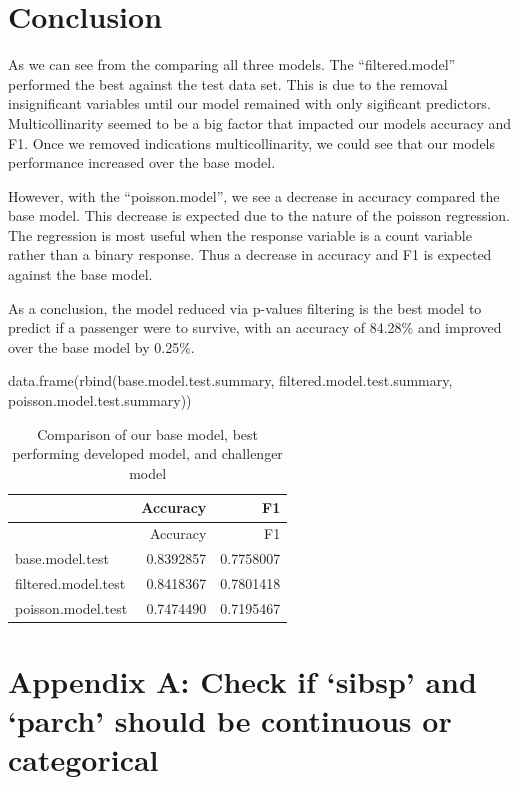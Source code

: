 \documentclass[
  letterpaper,
  DIV=11,
  numbers=noendperiod]{scrartcl}
\newenvironment{Shaded}{\begin{snugshade}}{\end{snugshade}}
\newcommand{\FunctionTok}[1]{\textcolor[rgb]{0.28,0.35,0.67}{#1}}
\newcommand{\NormalTok}[1]{\textcolor[rgb]{0.00,0.23,0.31}{#1}}
\begin{document}
\section{Conclusion}\label{conclusion}

As we can see from the comparing all three models. The
``filtered.model'' performed the best against the test data set. This is
due to the removal insignificant variables until our model remained with
only sigificant predictors. Multicollinarity seemed to be a big factor
that impacted our models accuracy and F1. Once we removed indications
multicollinarity, we could see that our models performance increased
over the base model.

However, with the ``poisson.model'', we see a decrease in accuracy
compared the base model. This decrease is expected due to the nature of
the poisson regression. The regression is most useful when the response
variable is a count variable rather than a binary response. Thus a
decrease in accuracy and F1 is expected against the base model.

As a conclusion, the model reduced via p-values filtering is the best
model to predict if a passenger were to survive, with an accuracy of
84.28\% and improved over the base model by 0.25\%.

\begin{Shaded}
\begin{Highlighting}[]
\FunctionTok{data.frame}\NormalTok{(}\FunctionTok{rbind}\NormalTok{(base.model.test.summary, }
\NormalTok{                 filtered.model.test.summary,}
\NormalTok{                 poisson.model.test.summary))}
\end{Highlighting}
\end{Shaded}

\begin{longtable}[]{@{}lrr@{}}
\caption{Comparison of our base model, best performing developed model,
and challenger model}\tabularnewline
\toprule\noalign{}
& Accuracy & F1 \\
\midrule\noalign{}
\endfirsthead
\toprule\noalign{}
& Accuracy & F1 \\
\midrule\noalign{}
\endhead
\bottomrule\noalign{}
\endlastfoot
base.model.test & 0.8392857 & 0.7758007 \\
filtered.model.test & 0.8418367 & 0.7801418 \\
poisson.model.test & 0.7474490 & 0.7195467 \\
\end{longtable}

\section*{Appendix A: Check if `sibsp' and `parch' should be continuous
or categorical}\label{appendix_A}
\end{document}
